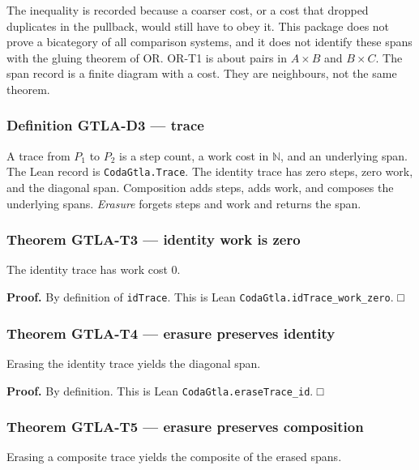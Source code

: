 \documentclass[
  11pt,
]{article}
\begin{document}
The inequality is recorded because a coarser cost, or a cost that dropped duplicates in the pullback, would still have to obey it. This package does not prove a bicategory of all comparison systems, and it does not identify these spans with the gluing theorem of OR. OR-T1 is about pairs in \(A\times B\) and \(B\times C\). The span record is a finite diagram with a cost. They are neighbours, not the same theorem.

\subsubsection{Definition GTLA-D3 --- trace}\label{definition-gtla-d3-trace}

A trace from \(P_1\) to \(P_2\) is a step count, a work cost in \(\mathbb{N}\), and an underlying span. The Lean record is \texttt{CodaGtla.Trace}. The identity trace has zero steps, zero work, and the diagonal span. Composition adds steps, adds work, and composes the underlying spans. \emph{Erasure} forgets steps and work and returns the span.

\subsubsection{Theorem GTLA-T3 --- identity work is zero}\label{theorem-gtla-t3-identity-work-is-zero}

The identity trace has work cost \(0\).

\textbf{Proof.} By definition of \texttt{idTrace}. This is Lean \nolinkurl{CodaGtla.idTrace_work_zero}. □

\subsubsection{Theorem GTLA-T4 --- erasure preserves identity}\label{theorem-gtla-t4-erasure-preserves-identity}

Erasing the identity trace yields the diagonal span.

\textbf{Proof.} By definition. This is Lean \nolinkurl{CodaGtla.eraseTrace_id}. □

\subsubsection{Theorem GTLA-T5 --- erasure preserves composition}\label{theorem-gtla-t5-erasure-preserves-composition}

Erasing a composite trace yields the composite of the erased spans.
\end{document}
